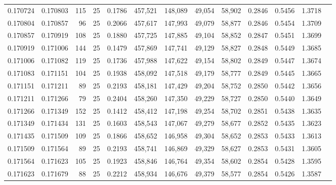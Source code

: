 \begin{tabular}{rrrrrrrrrrrrr}
0.170724 & 0.170803 &   115 &  25 &                                     0.1786 & 457,521 & 148,089 &  49,054 &  58,902 & 0.2846 & 0.5456 & 1.3718 \\
0.170804 & 0.170857 &    96 &  25 &                                     0.2066 & 457,617 & 147,993 &  49,079 &  58,877 & 0.2846 & 0.5454 & 1.3709 \\
0.170857 & 0.170919 &   108 &  25 &                                     0.1880 & 457,725 & 147,885 &  49,104 &  58,852 & 0.2847 & 0.5451 & 1.3699 \\
0.170919 & 0.171006 &   144 &  25 &                                     0.1479 & 457,869 & 147,741 &  49,129 &  58,827 & 0.2848 & 0.5449 & 1.3685 \\
0.171006 & 0.171082 &   119 &  25 &                                     0.1736 & 457,988 & 147,622 &  49,154 &  58,802 & 0.2849 & 0.5447 & 1.3674 \\
0.171083 & 0.171151 &   104 &  25 &                                     0.1938 & 458,092 & 147,518 &  49,179 &  58,777 & 0.2849 & 0.5445 & 1.3665 \\
0.171151 & 0.171211 &    89 &  25 &                                     0.2193 & 458,181 & 147,429 &  49,204 &  58,752 & 0.2850 & 0.5442 & 1.3656 \\
0.171211 & 0.171266 &    79 &  25 &                                     0.2404 & 458,260 & 147,350 &  49,229 &  58,727 & 0.2850 & 0.5440 & 1.3649 \\
0.171266 & 0.171349 &   152 &  25 &                                     0.1412 & 458,412 & 147,198 &  49,254 &  58,702 & 0.2851 & 0.5438 & 1.3635 \\
0.171349 & 0.171434 &   131 &  25 &                                     0.1603 & 458,543 & 147,067 &  49,279 &  58,677 & 0.2852 & 0.5435 & 1.3623 \\
0.171435 & 0.171509 &   109 &  25 &                                     0.1866 & 458,652 & 146,958 &  49,304 &  58,652 & 0.2853 & 0.5433 & 1.3613 \\
0.171509 & 0.171564 &    89 &  25 &                                     0.2193 & 458,741 & 146,869 &  49,329 &  58,627 & 0.2853 & 0.5431 & 1.3605 \\
0.171564 & 0.171623 &   105 &  25 &                                     0.1923 & 458,846 & 146,764 &  49,354 &  58,602 & 0.2854 & 0.5428 & 1.3595 \\
0.171623 & 0.171679 &    88 &  25 &                                     0.2212 & 458,934 & 146,676 &  49,379 &  58,577 & 0.2854 & 0.5426 & 1.3587 \\

\end{tabular}
